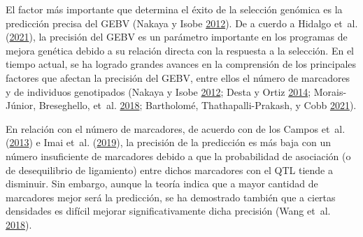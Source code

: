 \documentclass[11pt,spanish,a4paper,oneside,]{book} %
\begin{document}
El factor más importante que determina el éxito de la selección genómica es la predicción precisa del GEBV (Nakaya y Isobe \protect\hyperlink{ref-cite:6}{2012}). De a cuerdo a Hidalgo et~al. (\protect\hyperlink{ref-cite:89}{2021}), la precisión del GEBV es un parámetro importante en los programas de mejora genética debido a su relación directa con la respuesta a la selección. En el tiempo actual, se ha logrado grandes avances en la comprensión de los principales factores que afectan la precisión del GEBV, entre ellos el número de marcadores y de individuos genotipados (Nakaya y Isobe \protect\hyperlink{ref-cite:6}{2012}; Desta y Ortiz \protect\hyperlink{ref-cite:10}{2014}; Morais-Júnior, Breseghello, et~al. \protect\hyperlink{ref-cite:68}{2018}; Bartholomé, Thathapalli-Prakash, y Cobb \protect\hyperlink{ref-cite:58}{2021}).

En relación con el número de marcadores, de acuerdo con de los Campos et~al. (\protect\hyperlink{ref-cite:31}{2013}) e Imai et~al. (\protect\hyperlink{ref-cite:20}{2019}), la precisión de la predicción es más baja con un número insuficiente de marcadores debido a que la probabilidad de asociación (o de desequilibrio de ligamiento) entre dichos marcadores con el QTL tiende a disminuir. Sin embargo, aunque la teoría indica que a mayor cantidad de marcadores mejor será la predicción, se ha demostrado también que a ciertas densidades es difícil mejorar significativamente dicha precisión (Wang et~al. \protect\hyperlink{ref-cite:77}{2018}).
\end{document}
